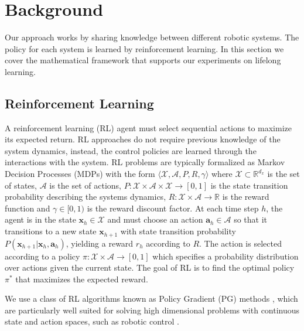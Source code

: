 \documentclass{aamas2016}
\renewcommand{\Re}{\mathbb{R}}
\begin{document}
\section{Background} \label{background}
Our approach works by sharing knowledge between different robotic systems. The policy for each system is learned by reinforcement learning. In this section we cover the mathematical framework that supports our experiments on lifelong learning.

\subsection{Reinforcement Learning}

A reinforcement learning (RL) agent must select sequential actions to maximize its expected return. RL approaches do not 
require previous knowledge of the system dynamics, instead, the control policies are learned through the interactions with the system.
RL problems are typically formalized as Markov Decision Processes (MDPs) with the form $\langle \mathcal{X}, \mathcal{A}, P, R, \gamma \rangle$ where
$\mathcal{X}\subset\Re^{d_{x}}$ is the set of states, $\mathcal{A}$ is the set of actions, 
$P:\mathcal{X}\times \mathcal{A}\times \mathcal{X}\rightarrow [0,1]$ is the state transition probability describing the systems dynamics,
$R:\mathcal{X}\times \mathcal{A} \rightarrow \Re$ is the reward function and $\gamma \in [0,1)$ is the reward discount factor. At each time 
step $h$, the agent is in the state $\mathbf{x}_{h} \in \mathcal{X}$ and must choose an action $\mathbf{a}_{h} \in \mathcal{A}$ so that
it transitions to a new state $\mathbf{x}_{h+1}$ with state transition probability 
$P(\mathbf{x}_{h+1}|\mathbf{x}_{h},\mathbf{a}_{h})$, yielding 
a reward $r_{h}$ according to $R$. The action is selected according to a policy $\pi:\mathcal{X}\times \mathcal{A} \rightarrow [0,1]$ which
specifies a probability distribution over actions given the current state. The goal of RL is to find the optimal policy $\pi^{*}$ 
that maximizes the expected reward.

We use a class of RL algorithms known as Policy Gradient (PG) methods \cite{sutton1999policy}, which are particularly well suited for solving high dimensional problems with continuous state and action spaces, such as robotic control \cite{peters2008natural}. %
\end{document}
